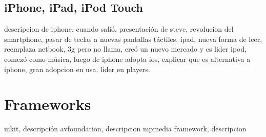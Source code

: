 
		\subsection{iPhone, iPad, iPod Touch}
		descripcion de iphone, cuando salió, presentación de steve, revolucion del smartphone, pasar de teclas a nuevas pantallas táctiles.
		ipad, nueva forma de leer, reemplaza netbook, 3g pero no llama, creó un nuevo mercado y es lider
		ipod, comezó como música, luego de iphone adopta ios, explicar que es alternativa a iphone, gran adopcion en usa.  lider en players.
	\section{Frameworks}
	uikit, descripción 
	avfoundation, descripcion
	mpmedia framework, descripcion
	
